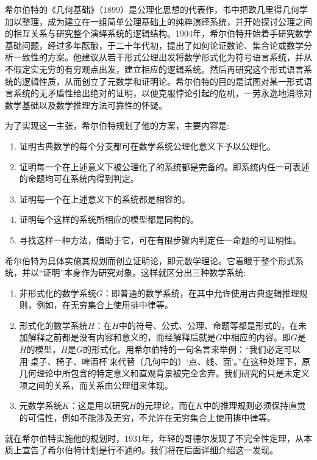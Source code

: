 \documentclass{article}
\begin{document}
希尔伯特的《几何基础》（1899）是公理化思想的代表作，书中把欧几里得几何学加以整理，成为建立在一组简单公理基础上的纯粹演绎系统，并开始探讨公理之间的相互关系与研究整个演绎系统的逻辑结构。1904年，希尔伯特开始着手研究数学基础问题，经过多年酝酿，于二十年代初，提出了如何论证数论、集合论或数学分析一致性的方案。他建议从若干形式公理出发将数学形式化为符号语言系统，并从不假定实无穷的有穷观点出发，建立相应的逻辑系统。然后再研究这个形式语言系统的逻辑性质，从而创立了元数学和证明论。希尔伯特的目的是试图对某一形式语言系统的无矛盾性给出绝对的证明，以便克服悖论引起的危机，一劳永逸地消除对数学基础以及数学推理方法可靠性的怀疑。

为了实现这一主张，希尔伯特规划了他的方案，主要内容是:
\begin{enumerate}
\item 证明古典数学的每个分支都可在数学系统公理化意义下予以公理化。
\item 证明每一个在上述意义下被公理化了的系统都是完备的。即系统内任一可表述的命题均可在系统内得到判定。
\item 证明每一个在上述意义下的系统都是相容的。
\item 证明每个这样的系统所相应的模型都是同构的。
\item 寻找这样一种方法，借助于它，可在有限步骤内判定任一命题的可证明性。
\end{enumerate}

希尔伯特为具体实施其规划而创立证明论，即元数学理论。它着眼于整个形式系统，并以“证明”本身作为研究对象。这样就区分出三种数学系统:
\begin{enumerate}
\item 非形式化的数学系统$G$：即普通的数学系统，在其中允许使用古典逻辑推理规则，例如，在无穷集合上使用排中律等。
\item 形式化的数学系统$H$：在$H$中的符号、公式、公理、命题等都是形式的，在未加解释之前都是没有内容和意义的，而经解释后就是$G$中相应的内容。即$G$是$H$的模型，$H$是$G$的形式化。用希尔伯特的一句名言来举例：“我们必定可以用‘桌子、椅子、啤酒杯’来代替（几何中的）‘点、线、面’。”在这种处理下，原几何理论中所包含的特定意义和直观背景被完全舍弃。我们研究的只是未定义项之间的关系，而关系由公理组来体现。
\item 元数学系统$K$：这是用以研究$H$的元理论，而在$K$中的推理规则必须保持直觉的可信性，例如不能涉及无穷，不允许在无穷集合上使用排中律等。
\end{enumerate}

就在希尔伯特实施他的规划时，1931年，年轻的哥德尔发现了不完全性定理，从本质上宣告了希尔伯特计划是行不通的。我们将在后面详细介绍这一发现。
\end{document}

